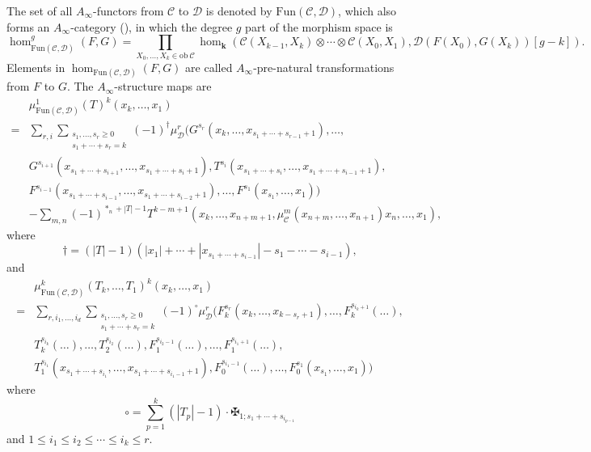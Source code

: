 \documentclass[11pt]{amsproc}
\def\K{{\mathbf{k}}}
\def\cc{\mathcal{C}}
\def\dd{\mathcal{D}}
\def\ainf{A_\infty}
\def\ob{\mathrm{ob\ }}
\def\fun{\mathrm{Fun}}
\theoremstyle{remark}
\numberwithin{equation}{section}
\begin{document}
The set of all $\ainf$-functors from $\cc$ to $\dd$ is denoted by $\fun(\cc, \dd)$, which also forms an $\ainf$-category (\cite{seidel_book}),
in which the degree $g$ part of the morphism space is
\begin{equation}\label{hom in fun}
\hom_{\fun(\cc, \dd)}^{g}(F, G) = \prod_{X_0, \ldots, X_k \in \ob \cc} \hom_{\K}(\cc(X_{k-1}, X_{k}) \otimes \cdots \otimes \cc(X_{0}, X_{1}), \dd(F(X_{0}), G(X_{k}))[g - k]).
\end{equation}
Elements in $\hom_{\fun(\cc, \dd)}(F, G)$ are called $\ainf$-pre-natural transformations from $F$ to $G$.
The $\ainf$-structure maps are
\begin{equation}\label{mu1 in fun}
    \begin{split}
   & \mu^{1}_{\fun(\cc, \dd)}(T)^{k}(x_k, \ldots, x_1)\\
   = &\sum_{r, i} \sum_{\substack{s_{1}, \ldots, s_{r} \ge 0\\s_{1}+\cdots+s_{r}=k}} (-1)^{\dagger} \mu_{\dd}^{r}(G^{s_{r}}(x_{k}, \ldots, x_{s_{1}+\cdots+s_{r-1}+1}), \ldots, \\
    &G^{s_{i+1}}(x_{s_{1}+\cdots+s_{i+1}}, \ldots, x_{s_{1}+\cdots+s_{i}+1}), T^{s_{i}}(x_{s_{1}+\cdots+s_{i}}, \ldots, x_{s_{1}+\cdots+s_{i-1}+1}),\\
    & F^{s_{i-1}}(x_{s_{1}+\cdots+s_{i-1}}, \ldots, x_{s_{1}+\cdots+s_{i-2}+1}) , \ldots, F^{s_{1}}(x_{s_{1}}, \ldots, x_{1})) \\
    &-\sum_{m,n} (-1)^{*_{n}+|T|-1}T^{k-m+1}(x_{k},\ldots, x_{n+m+1}, \mu_{\cc}^{m}(x_{n+m},\ldots,x_{n+1}) x_{n}, \ldots, x_{1}),
    \end{split}
\end{equation}
where
\begin{equation}
\dagger = (|T|-1)(|x_{1}|+\cdots+|x_{s_{1}+\cdots+s_{i-1}}|-s_{1}-\cdots-s_{i-1}),
\end{equation}
and 
\begin{equation}\label{muk in fun}
    \begin{split}
    & \mu^{k}_{\fun(\cc,\dd)}(T_k, \ldots, T_1)^{k}(x_k, \ldots, x_1) \\
    = &\sum_{r, i_{1},\ldots,i_{d}} \sum_{\substack{s_{1},\ldots,s_{r} \ge 0\\s_{1}+\cdots+s_{r}=k}} (-1)^{\circ} \mu^{r}_{\dd}( F_{k}^{s_{r}}(x_{k}, \ldots, x_{k-s_{r}+1}), \ldots, F_{k}^{s_{i_{k}+1}}(\ldots),\\
       &T_{k}^{s_{i_{k}}}(\ldots), \ldots, T_{2}^{s_{i_{2}}}(\ldots), F_1^{s_{i_{2}-1}}(\ldots), \ldots, F_{1}^{s_{i_{1}+1}}(\ldots), \\
    &T_{1}^{s_{i_{1}}}(x_{s_{1}+\cdots+s_{i_{1}}}, \ldots, x_{s_{1}+\cdots+s_{i_{1}-1}+1}), F_0^{s_{i_{1}-1}}(\ldots), \ldots, F_0^{s_{1}}(x_{s_{1}},\ldots,x_{1}))
\end{split}
\end{equation}
where
\begin{equation}\label{signforfunctorcomp}
\circ = \sum_{p=1}^{k}(|T_{p}|-1) \cdot \maltese_{1; s_{1}+\cdots+s_{i_{p-1}}}
\end{equation}
and $1 \le i_{1} \le i_{2} \le \cdots \le i_{k} \le r$.
\end{document}
